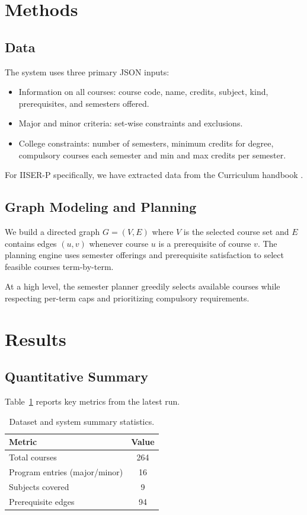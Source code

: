 \section{Methods}

\subsection{Data}
The system uses three primary JSON inputs:

\begin{itemize}
    \item Information on all courses: course code, name, credits, subject, kind,
    prerequisites, and semesters offered.
    \item Major and minor criteria: set-wise constraints and exclusions.
    \item College constraints: number of semesters, minimum credits for degree, compulsory courses each semester and min and max credits per semester.
\end{itemize}

For IISER-P specifically, we have extracted data from the Curriculum handbook \citep{iiser_data}.

\subsection{Graph Modeling and Planning}
We build a directed graph $G=(V,E)$ where $V$ is the selected course set and
$E$ contains edges $(u,v)$ whenever course $u$ is a prerequisite of course $v$.
The planning engine uses semester offerings and prerequisite satisfaction to
select feasible courses term-by-term.

At a high level, the semester planner greedily selects available courses while
respecting per-term caps and prioritizing compulsory requirements.

\section{Results}
\subsection{Quantitative Summary}
Table~\ref{tab:summary} reports key metrics from the latest run.

\begin{table}[tbp]
    \centering
    \caption{Dataset and system summary statistics.}
    \label{tab:summary}
    \begin{tabular}{|l|c|}
        \hline
        Metric & Value \\
        \hline
        Total courses & 264 \\
        Program entries (major/minor) & 16 \\
        Subjects covered & 9 \\
        Prerequisite edges & 94 \\
        \hline
    \end{tabular}
\end{table}

